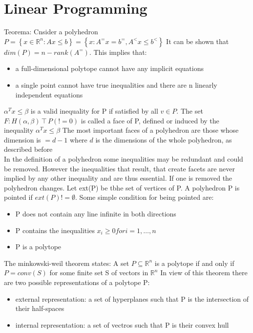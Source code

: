 \section*{Linear Programming}
Teorema: Cnsider a polyhedron
    $P = \left\{ x \in \mathbb{R}^n : Ax\leq b \right\} = \left\{ x: A^=x = b^=, A^<x \leq b^< \right\}$
    It can be shown that $dim(P) = n - rank(A^=)$.
    This implies that:
    \begin{itemize}
        \item a full-dimensional polytope cannot have any implicit equations
        \item a single point cannot have true inequalities and there are n linearly independent equations
    \end{itemize}
    $\alpha^T x \leq \beta$ is a valid inequality for P if satisfied by all $v \in P$. The set $F: H(\alpha, \beta) \intercal P(!=0)$ is called a face of P, defined or induced by the inequality
    $\alpha^T x \leq \beta$
    The most important faces of a polyhedron are those whose dimension is $ = d- 1$ where $d$ is the dimensions of the whole polyhedron, as described before\\
    In the definition of a polyhedron some inequalities may be redundant and could be removed. However the inequalities that result, that create
    facets are never implied by any other inequality and are thus essential. If one is removed the polyhedron changes. \newline
    Let ext(P) be tbhe set of vertices of P. A polyhedron P is pointed if $ext(P) != \emptyset$. Some simple condition for being pointed are:
    \begin{itemize}
        \item P does not contain any line infinite in both directions
        \item P contains the inequalities $x_i \geq 0 for i= 1, \ldots, n$
        \item P is a polytope
    \end{itemize}
    The minkowski-weil theorem states: A set $P \subseteq \mathbb{R}^n $ is a polytope if and only if $P = conv(S)$ for some finite set S of vectors in $\mathbb{R}^n$
    In view of this theorem there are two possible representations of a polytope P:
    \begin{itemize}
        \item external representation: a set of hyperplanes such that P is the intersection of their half-spaces
        \item internal representation: a set of vectros such that P is their convex hull
    \end{itemize}

